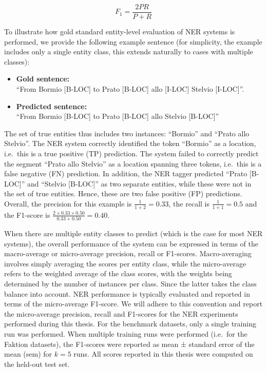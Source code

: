 \documentclass[12pt,a4paper,]{book}
\providecommand{\tightlist}{%
  \setlength{\itemsep}{0pt}\setlength{\parskip}{0pt}}
\begin{document}
\[
F_1 = \frac{2PR}{P + R}
\]

To illustrate how gold standard entity-level evaluation of NER systems is performed, we provide the following example sentence (for simplicity, the example includes only a single entity class, this extends naturally to cases with multiple classes):

\begin{itemize}
\tightlist
\item
  \textbf{Gold sentence: }\\
  ``From Bormio {[}B-LOC{]} to Prato {[}B-LOC{]} allo {[}I-LOC{]} Stelvio {[}I-LOC{]}''.
\item
  \textbf{Predicted sentence: }\\
  ``From Bormio {[}B-LOC{]} to Prato {[}B-LOC{]} allo Stelvio {[}B-LOC{]}''
\end{itemize}

The set of true entities thus includes two instances: ``Bormio'' and ``Prato allo Stelvio''. The NER system correctly identified the token ``Bormio'' as a location, i.e.~this is a true positive (TP) prediction. The system failed to correctly predict the segment ``Prato allo Stelvio'' as a location spanning three tokens, i.e.~this is a false negative (FN) prediction. In addition, the NER tagger predicted ``Prato {[}B-LOC{]}'' and ``Stelvio {[}B-LOC{]}'' as two separate entities, while these were not in the set of true entities. Hence, these are two false positive (FP) predictions. Overall, the precision for this example is \(\frac{1}{1+2} = 0.33\), the recall is \(\frac{1}{1 + 1} = 0.5\) and the F1-score is \(\frac{2 \times 0.33 \times 0.50}{0.33 + 0.50} = 0.40\).

When there are multiple entity classes to predict (which is the case for most NER systems), the overall performance of the system can be expressed in terms of the macro-average or micro-average precision, recall or F1-scores. Macro-averaging involves simply averaging the scores per entity class, while the micro-average refers to the weighted average of the class scores, with the weights being determined by the number of instances per class. Since the latter takes the class balance into account. NER performance is typically evaluated and reported in terms of the micro-average F1-score. We will adhere to this convention and report the micro-average precision, recall and F1-scores for the NER experiments performed during this thesis. For the benchmark datasets, only a single training run was performed. When multiple training runs were performed (i.e.~for the Faktion datasets), the F1-scores were reported as mean ± standard error of the mean (sem) for \(k = 5\) runs. All scores reported in this thesis were computed on the held-out test set.
\end{document}

